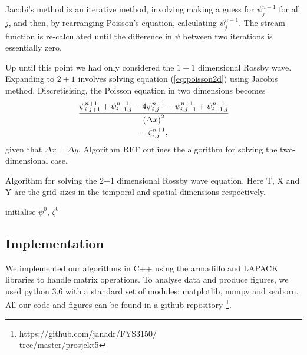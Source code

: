 Jacobi's method is an iterative method, involving making a guess for $\psi^{n+1}_j$ for all $j$, and then, by rearranging Poisson's equation, calculating $\psi_j^{n+1}$. The stream function is re-calculated until the difference in $\psi$ between two iterations is essentially zero.

Up until this point we had only considered the $1 + 1$ dimensional Rossby wave. Expanding to $2 + 1$ involves solving equation (\ref{eq:poisson2d}) using Jacobis method. Discretisising, the Poisson equation in two dimensions becomes
	\begin{multline}
	\label{eq:poissondiscret}
	\frac{\psi^{n+1}_{i,j+1} + \psi^{n+1}_{i+1,j} - 4\psi^{n+1}_{i,j} + \psi^{n+1}_{i,j-1}+ \psi^{n+1}_{i-1,j}}{\qty(\Delta x)^2} \\= \zeta^{n+1}_{i,j},
	\end{multline}
given that $\Delta x = \Delta y$. Algorithm REF outlines the algorithm for solving the two-dimensional case.

\begin{algorithm}[htbp]
	\caption{Algorithm for solving the 2+1 dimensional Rossby wave equation. Here T, X and Y are the grid sizes in the temporal and spatial dimensions respectively.}
	\SetAlgoLined
	\BlankLine
	\BlankLine
	initialise $\psi^0,\, \zeta^0$\;
	\BlankLine
	\BlankLine
	\label{algo:2drossby}
\end{algorithm}

\subsection{Implementation}
\label{sec:implement}
We implemented our algorithms in C++ using the armadillo and LAPACK libraries to handle matrix operations. To analyse data and produce figures, we used python 3.6 with a standard set of modules: matplotlib, numpy and seaborn. All our code and figures can be found in a github repository \footnote{https://github.com/janadr/FYS3150/ \\tree/master/prosjekt5}.
